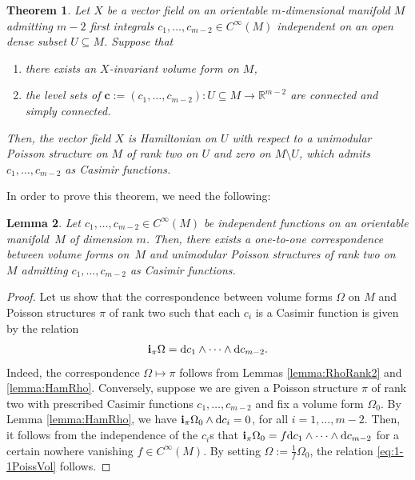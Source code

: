\documentclass[pdftex]{sigma}%
\newcommand{\R}[1]{\mathbb{R}^{#1}}
\newcommand{\dd}{{\rm d}}
\newcommand{\ii}{\mathbf{i}}
\numberwithin{equation}{section}
\newtheorem{Theorem}{Theorem}[section]
\newtheorem{Lemma}[Theorem]{Lemma}
\begin{document}
\begin{Theorem}\label{teo:VolHam}
Let $X$ be a vector field on an orientable $m$-dimensional manifold $M$ admitting $m-2$ first integrals $c_1, \dots, c_{m-2} \in C^{\infty}(M)$ independent on an open dense subset $U \subseteq M$. Suppose that
 \begin{enumerate}\itemsep=0pt
 \item[$1)$] there exists an $X$-invariant volume form on $M$,
 \item[$2)$] the level sets of $\boldsymbol{c}:=(c_1,\dots,c_{m-2})\colon U \subseteq M \to \R{m-2}$ are connected and simply connected.
 \end{enumerate}
Then, the vector field $X$ is Hamiltonian on $U$ with respect to a unimodular Poisson structure on $M$ of rank two on $U$ and zero on $M \setminus U$, which admits $c_1,\dots,c_{m-2}$ as Casimir functions.
\end{Theorem}

In order to prove this theorem, we need the following:

\begin{Lemma}\label{lemma:1-1PoissVol}
Let $c_1,\dots,c_{m-2} \in C^{\infty}(M)$ be independent functions on an orientable manifold~$M$ of dimension $m$. Then, there exists a one-to-one correspondence between volume forms on~$M$ and unimodular Poisson structures of rank two on $M$ admitting $c_1,\dots,c_{m-2}$ as Casimir functions.
\end{Lemma}
\begin{proof}
Let us show that the correspondence between volume forms $\Omega$ on $M$ and Poisson structures $\pi$ of rank two such that each $c_i$ is a Casimir function is given by the relation
 \begin{equation}\label{eq:1-1PoissVol}
 \ii_{\pi}\Omega = \dd c_1 \wedge \cdots \wedge \dd c_{m-2}.
 \end{equation}
Indeed, the correspondence $\Omega \mapsto \pi$ follows from Lemmas \ref{lemma:RhoRank2} and \ref{lemma:HamRho}. Conversely, suppose we are given a Poisson structure $\pi$ of rank two with prescribed Casimir functions $c_1,\dots,c_{m-2}$ and fix a volume form $\Omega_0$. By Lemma \ref{lemma:HamRho}, we have $\ii_{\pi}\Omega_{0} \wedge \dd c_{i} = 0$, for all $i = 1,\dots,m-2$. Then, it follows from the independence of the $c_{i}$s that $\ii_{\pi}\Omega_{0} = f \dd c_1 \wedge \cdots \wedge \dd c_{m-2}$ for a certain nowhere vanishing $f \in C^{\infty}(M)$. By setting $\Omega := \tfrac{1}{f}\Omega_{0}$, the relation \eqref{eq:1-1PoissVol} follows.
\end{proof}
\end{document}
